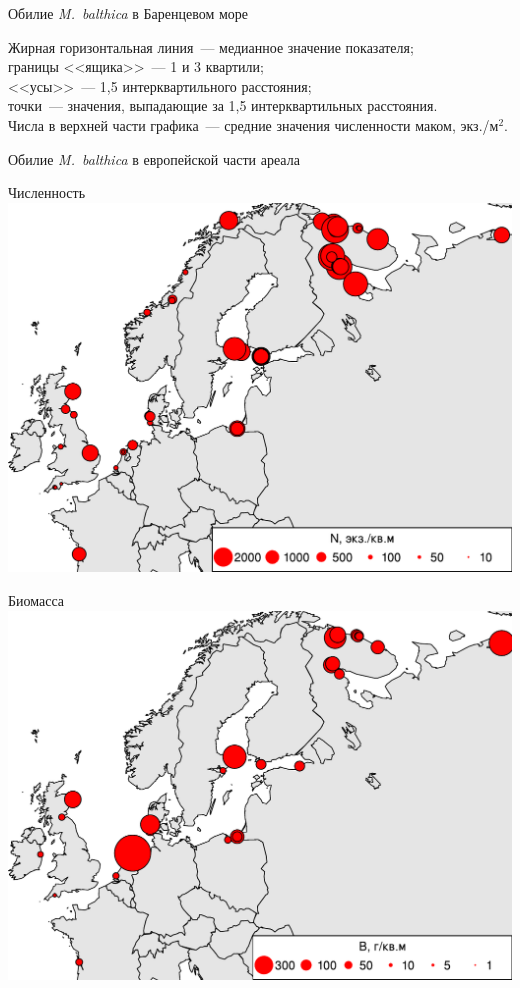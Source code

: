 \documentclass{beamer}
\begin{document}
\begin{frame}{Обилие {\it M.~balthica} в Баренцевом море}
\begin{tiny} Жирная горизонтальная линия~--- медианное значение показателя;\\
границы <<ящика>>~--- 1 и 3 квартили;\\ <<усы>>~--- 1,5 интерквартильного расстояния;\\ 
точки~--- значения, выпадающие за 1,5 интерквартильных расстояния.\\ 
Числа в верхней части графика~--- средние значения численности маком, экз./м$^2$.
\end{tiny}
\end{frame}



\begin{frame}{Обилие {\it M.~balthica} в европейской части ареала}
	\begin{minipage}[t]{.49\linewidth}
		\begin{center}
		{\footnotesize Численность}
			\includegraphics[width=\textwidth]{Nmean_ru1.pdf}
		\end{center}
	\end{minipage}
%
	\begin{minipage}[t]{.49\linewidth}
		\begin{center}
		{\footnotesize Биомасса}
			\includegraphics[width=\textwidth]{Bmean_ru1.pdf}

\end{center}
\end{minipage}
\end{frame}
\end{document}
